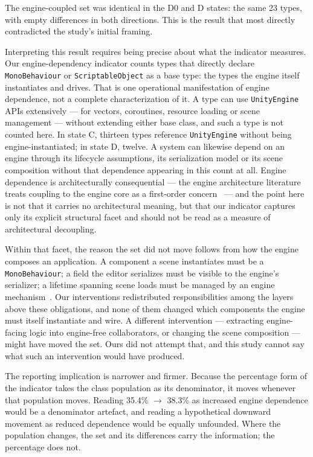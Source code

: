 \documentclass[pdflatex,sn-basic]{sn-jnl}
\begin{document}
The engine-coupled set was identical in the D0 and D states: the same 23 types, with empty differences in both directions. This is the result that most directly contradicted the study's initial framing.

Interpreting this result requires being precise about what the indicator measures. Our engine-dependency indicator counts types that directly declare \texttt{MonoBehaviour} or \texttt{ScriptableObject} as a base type: the types the engine itself instantiates and drives. That is one operational manifestation of engine dependence, not a complete characterization of it. A type can use \texttt{UnityEngine} APIs extensively --- for vectors, coroutines, resource loading or scene management --- without extending either base class, and such a type is not counted here. In state C, thirteen types reference \texttt{UnityEngine} without being engine-instantiated; in state D, twelve. A system can likewise depend on an engine through its lifecycle assumptions, its serialization model or its scene composition without that dependence appearing in this count at all. Engine dependence is architecturally consequential --- the engine architecture literature treats coupling to the engine core as a first-order concern~\citep{politowski2025,ullmann2023} --- and the point here is not that it carries no architectural meaning, but that our indicator captures only its explicit structural facet and should not be read as a measure of architectural decoupling.

Within that facet, the reason the set did not move follows from how the engine composes an application. A component a scene instantiates must be a \texttt{MonoBehaviour}; a field the editor serializes must be visible to the engine's serializer; a lifetime spanning scene loads must be managed by an engine mechanism~\citep{unitydocs}. Our interventions redistributed responsibilities among the layers above these obligations, and none of them changed which components the engine must itself instantiate and wire. A different intervention --- extracting engine-facing logic into engine-free collaborators, or changing the scene composition --- might have moved the set. Ours did not attempt that, and this study cannot say what such an intervention would have produced.

The reporting implication is narrower and firmer. Because the percentage form of the indicator takes the class population as its denominator, it moves whenever that population moves. Reading 35.4\% $\rightarrow$ 38.3\% as increased engine dependence would be a denominator artefact, and reading a hypothetical downward movement as reduced dependence would be equally unfounded. Where the population changes, the set and its differences carry the information; the percentage does not.
\end{document}
